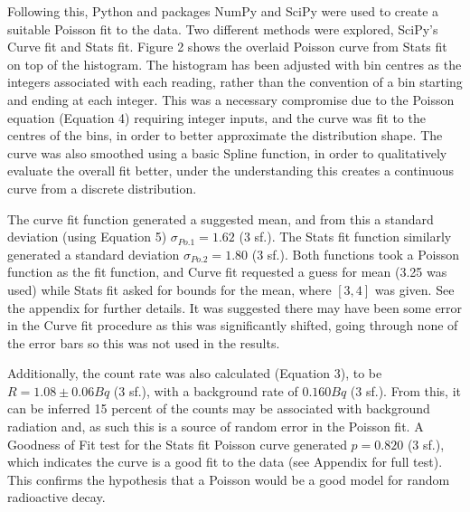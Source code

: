 \documentclass[11pt]{article}
\begin{document}
\noindent Following this, Python and packages NumPy and SciPy were used to create a suitable Poisson fit to the data. Two different methods were explored, SciPy's Curve fit and Stats fit. 
Figure 2 shows the overlaid Poisson curve from Stats fit on top of the histogram. The histogram has been adjusted with bin centres as the integers associated with each reading, rather than the convention of a bin starting and ending at each integer. This was a necessary compromise due to the Poisson equation (Equation 4) requiring integer inputs, and the curve was fit to the centres of the bins, in order to better approximate the distribution shape. The curve was also smoothed using a basic Spline function, in order to qualitatively evaluate the overall fit better, under the understanding this creates a continuous curve from a discrete distribution.

\noindent The curve fit function generated a suggested mean, and from this a standard deviation (using Equation 5) $\sigma_{Po.1} = 1.62$ (3 sf.). The Stats fit function similarly generated a standard deviation $\sigma_{Po.2} = 1.80 $ (3 sf.). Both functions took a Poisson function as the fit function, and Curve fit requested a guess for mean (3.25 was used) while Stats fit asked for bounds for the mean, where $[3,4]$ was given. See the appendix for further details. It was suggested there may have been some error in the Curve fit procedure as this was significantly shifted, going through none of the error bars so this was not used in the results. 

\noindent Additionally, the count rate was also calculated (Equation 3), to be $R = 1.08 \pm 0.06  Bq$ (3 sf.), with a background rate of $0.160 Bq$ (3 sf.). From this, it can be inferred 15 percent of the counts may be associated with background radiation and, as such this is a source of random error in the Poisson fit.
A Goodness of Fit test for the Stats fit Poisson curve generated $p = 0.820$ (3 sf.), which indicates the curve is a good fit to the data (see Appendix for full test). This confirms the hypothesis that a Poisson would be a good model for random radioactive decay. 
\end{document}
